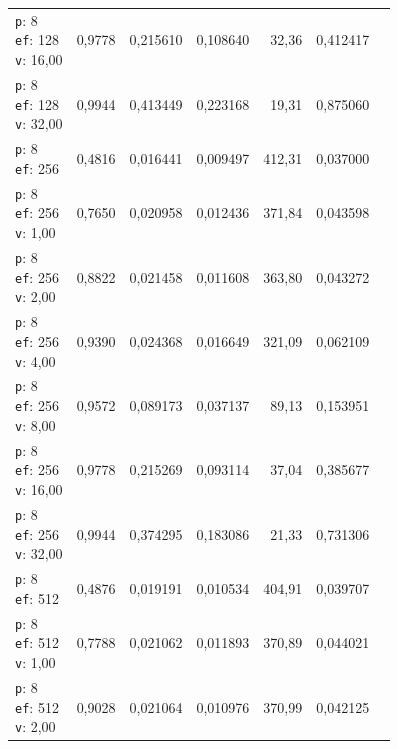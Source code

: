 \begin{table}[htbp]
\begin{tabularx}{\textwidth}{Xrrrrrr}
    \makecell{\texttt{p}: 8\\\texttt{ef}: 128\\\texttt{v}: 16,00} & 0,9778 & 0,215610 & 0,108640 & 32,36 & 0,412417 \\
    \makecell{\texttt{p}: 8\\\texttt{ef}: 128\\\texttt{v}: 32,00} & 0,9944 & 0,413449 & 0,223168 & 19,31 & 0,875060 \\
    \makecell{\texttt{p}: 8\\\texttt{ef}: 256} & 0,4816 & 0,016441 & 0,009497 & 412,31 & 0,037000 \\
    \makecell{\texttt{p}: 8\\\texttt{ef}: 256\\\texttt{v}: 1,00} & 0,7650 & 0,020958 & 0,012436 & 371,84 & 0,043598 \\
    \makecell{\texttt{p}: 8\\\texttt{ef}: 256\\\texttt{v}: 2,00} & 0,8822 & 0,021458 & 0,011608 & 363,80 & 0,043272 \\
    \makecell{\texttt{p}: 8\\\texttt{ef}: 256\\\texttt{v}: 4,00} & 0,9390 & 0,024368 & 0,016649 & 321,09 & 0,062109 \\
    \makecell{\texttt{p}: 8\\\texttt{ef}: 256\\\texttt{v}: 8,00} & 0,9572 & 0,089173 & 0,037137 & 89,13 & 0,153951 \\
    \makecell{\texttt{p}: 8\\\texttt{ef}: 256\\\texttt{v}: 16,00} & 0,9778 & 0,215269 & 0,093114 & 37,04 & 0,385677 \\
    \makecell{\texttt{p}: 8\\\texttt{ef}: 256\\\texttt{v}: 32,00} & 0,9944 & 0,374295 & 0,183086 & 21,33 & 0,731306 \\
    \makecell{\texttt{p}: 8\\\texttt{ef}: 512} & 0,4876 & 0,019191 & 0,010534 & 404,91 & 0,039707 \\
    \makecell{\texttt{p}: 8\\\texttt{ef}: 512\\\texttt{v}: 1,00} & 0,7788 & 0,021062 & 0,011893 & 370,89 & 0,044021 \\
    \makecell{\texttt{p}: 8\\\texttt{ef}: 512\\\texttt{v}: 2,00} & 0,9028 & 0,021064 & 0,010976 & 370,99 & 0,042125 \\

\end{tabularx}
\end{table}

